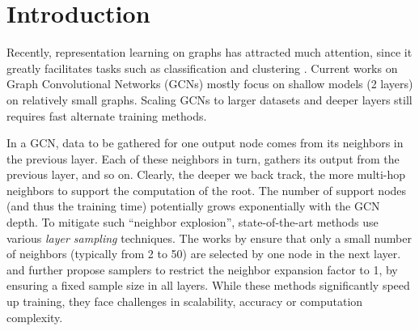\section{Introduction}

Recently, representation learning on graphs has attracted much attention, since it greatly facilitates tasks such as classification and clustering \citep{survey1,survey2}.
Current works on Graph Convolutional Networks (GCNs) \citep{graphsage,fastgcn,lgcn,as-gcn,s-gcn} mostly focus on shallow models (2 layers) on relatively small graphs. Scaling GCNs to larger datasets and deeper layers still requires fast alternate training methods.

In a GCN, data to be gathered for one output node comes from its neighbors in the previous layer. Each of these neighbors in turn, gathers its output from the previous layer, and so on. 
Clearly, the deeper we back track, the more multi-hop neighbors to support the computation of the root. The number of support nodes (and thus the training time) potentially grows exponentially with the GCN depth. 
To mitigate such ``neighbor explosion'', state-of-the-art methods %
use various \textit{layer sampling} techniques. The works by \cite{graphsage,gcn_web,s-gcn} ensure that only a small number of neighbors (typically from 2 to 50) are selected by one node in the next layer.
\cite{fastgcn} and \cite{as-gcn} further propose samplers to restrict the neighbor expansion factor to 1, by ensuring a fixed sample size in all layers. 
While these methods significantly speed up training, they face challenges in scalability, accuracy or computation complexity. 



